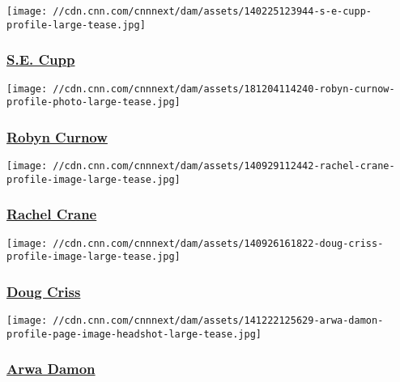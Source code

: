 \href{/profiles/s-e-cupp-profile}{}

\texttt{[image: //cdn.cnn.com/cnnnext/dam/assets/140225123944-s-e-cupp-profile-large-tease.jpg]}

\hypertarget{se-cupp}{%
\subsubsection{\texorpdfstring{\href{/profiles/s-e-cupp-profile}{S.E.
Cupp}}{S.E. Cupp}}\label{se-cupp}}

\href{/profiles/robyn-curnow-profile}{}

\texttt{[image: //cdn.cnn.com/cnnnext/dam/assets/181204114240-robyn-curnow-profile-photo-large-tease.jpg]}

\hypertarget{robyn-curnow}{%
\subsubsection{\texorpdfstring{\href{/profiles/robyn-curnow-profile}{Robyn
Curnow}}{Robyn Curnow}}\label{robyn-curnow}}

\href{/profiles/rachel-crane-profile}{}

\texttt{[image: //cdn.cnn.com/cnnnext/dam/assets/140929112442-rachel-crane-profile-image-large-tease.jpg]}

\hypertarget{rachel-crane}{%
\subsubsection{\texorpdfstring{\href{/profiles/rachel-crane-profile}{Rachel
Crane}}{Rachel Crane}}\label{rachel-crane}}

\href{/profiles/doug-criss-profile}{}

\texttt{[image: //cdn.cnn.com/cnnnext/dam/assets/140926161822-doug-criss-profile-image-large-tease.jpg]}

\hypertarget{doug-criss}{%
\subsubsection{\texorpdfstring{\href{/profiles/doug-criss-profile}{Doug
Criss}}{Doug Criss}}\label{doug-criss}}

\href{/profiles/arwa-damon}{}

\texttt{[image: //cdn.cnn.com/cnnnext/dam/assets/141222125629-arwa-damon-profile-page-image-headshot-large-tease.jpg]}

\hypertarget{arwa-damon}{%
\subsubsection{\texorpdfstring{\href{/profiles/arwa-damon}{Arwa
Damon}}{Arwa Damon}}\label{arwa-damon}}

